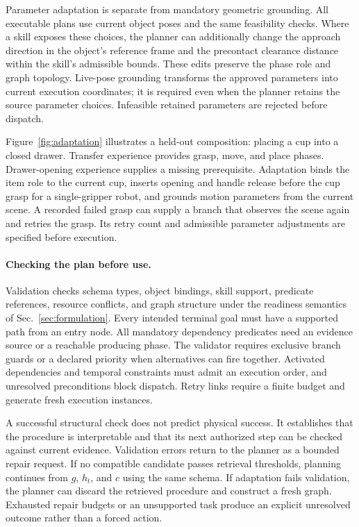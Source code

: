 \documentclass[10pt,twocolumn,letterpaper]{article}
\begin{document}
Parameter adaptation is separate from mandatory geometric grounding. All executable plans use current object poses and the same feasibility checks. Where a skill exposes these choices, the planner can additionally change the approach direction in the object's reference frame and the precontact clearance distance within the skill's admissible bounds. These edits preserve the phase role and graph topology. Live-pose grounding transforms the approved parameters into current execution coordinates; it is required even when the planner retains the source parameter choices. Infeasible retained parameters are rejected before dispatch.

Figure~\ref{fig:adaptation} illustrates a held-out composition: placing a cup into a closed drawer. Transfer experience provides grasp, move, and place phases. Drawer-opening experience supplies a missing prerequisite. Adaptation binds the item role to the current cup, inserts opening and handle release before the cup grasp for a single-gripper robot, and grounds motion parameters from the current scene. A recorded failed grasp can supply a branch that observes the scene again and retries the grasp. Its retry count and admissible parameter adjustments are specified before execution.

\paragraph{Checking the plan before use.}
Validation checks schema types, object bindings, skill support, predicate references, resource conflicts, and graph structure under the readiness semantics of Sec.~\ref{sec:formulation}. Every intended terminal goal must have a supported path from an entry node. All mandatory dependency predicates need an evidence source or a reachable producing phase. The validator requires exclusive branch guards or a declared priority when alternatives can fire together. Activated dependencies and temporal constraints must admit an execution order, and unresolved preconditions block dispatch. Retry links require a finite budget and generate fresh execution instances.

A successful structural check does not predict physical success. It establishes that the procedure is interpretable and that its next authorized step can be checked against current evidence. Validation errors return to the planner as a bounded repair request. If no compatible candidate passes retrieval thresholds, planning continues from $g$, $h_t$, and $c$ using the same schema. If adaptation fails validation, the planner can discard the retrieved procedure and construct a fresh graph. Exhausted repair budgets or an unsupported task produce an explicit unresolved outcome rather than a forced action.
\end{document}

